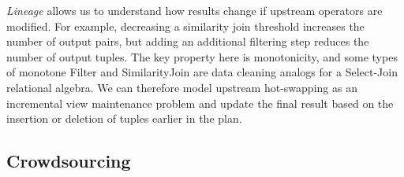 \textit{Lineage} allows us to understand how results change if upstream operators are modified.
For example, decreasing a similarity join threshold increases the number of output pairs, but adding an additional filtering step 
reduces the number of output tuples. The key property here is monotonicity, and some types of monotone \textsf{Filter} and \textsf{SimilarityJoin} are data cleaning analogs for a Select-Join relational algebra.
We can therefore model upstream hot-swapping as an incremental view maintenance problem and update the 
final result based on the insertion or deletion of tuples earlier in the plan.

\iffalse
\vspace{.5em}

{\noindent \bf Cost Estimates:} Of course, changing plans when using crowdsourcing may significantly change its cost.
For every recommendation, we estimate the number of additional tuples processed by the crowd operators and provide 
the user with an estimated cost.

\fi



\vspace{-0.2cm}
\subsection{Crowdsourcing}
\vspace{.2em}

